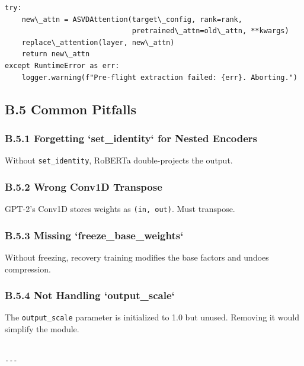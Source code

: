 \begin{lstlisting}
try:
    new\_attn = ASVDAttention(target\_config, rank=rank,
                              pretrained\_attn=old\_attn, **kwargs)
    replace\_attention(layer, new\_attn)
    return new\_attn
except RuntimeError as err:
    logger.warning(f"Pre-flight extraction failed: {err}. Aborting.")
\end{lstlisting}

\subsection{B.5 Common Pitfalls}

\subsubsection{B.5.1 Forgetting `set\_identity` for Nested Encoders}

Without \texttt{set\_identity}, RoBERTa double-projects the output.

\subsubsection{B.5.2 Wrong Conv1D Transpose}

GPT-2's Conv1D stores weights as \texttt{(in, out)}. Must transpose.

\subsubsection{B.5.3 Missing `freeze\_base\_weights`}

Without freezing, recovery training modifies the base factors and undoes 
compression.

\subsubsection{B.5.4 Not Handling `output\_scale`}

The \texttt{output\_scale} parameter is initialized to 1.0 but unused. Removing 
it would simplify the module.
\begin{lstlisting}

---
\end{lstlisting}
